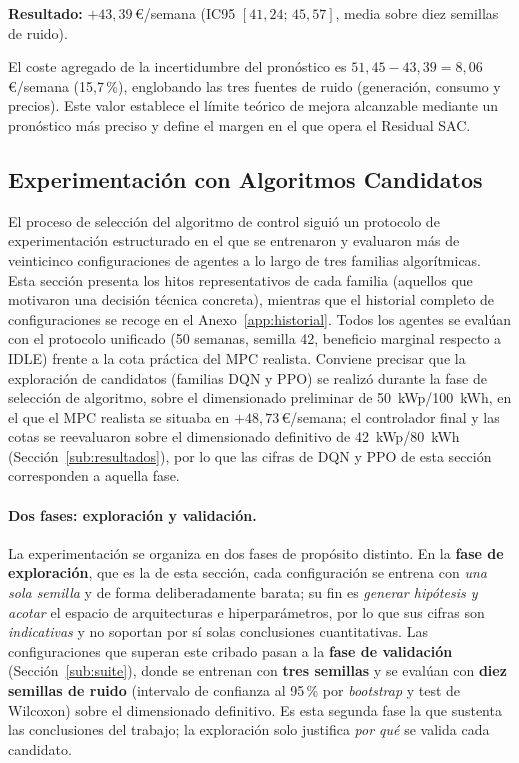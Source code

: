 \documentclass[12pt, a4paper, twoside]{report}
\begin{document}
\textbf{Resultado:} $+43{,}39$\,€/semana (IC95 $[41{,}24;\,45{,}57]$, media
sobre diez semillas de ruido).

El coste agregado de la incertidumbre del pronóstico es
$51{,}45 - 43{,}39 = 8{,}06$\,€/semana (15{,}7\,\%), englobando las tres
fuentes de ruido (generación, consumo y precios). Este valor establece el
límite teórico de mejora alcanzable mediante un pronóstico más preciso y define
el margen en el que opera el Residual SAC.

\subsection{Experimentación con Algoritmos Candidatos}
\label{sub:candidatos}

El proceso de selección del algoritmo de control siguió un protocolo de
experimentación estructurado en el que se entrenaron y evaluaron más de
veinticinco configuraciones de agentes a lo largo de tres familias
algorítmicas. Esta sección presenta los hitos representativos de cada familia
(aquellos que motivaron una decisión técnica concreta), mientras que el
historial completo de configuraciones se recoge en el
Anexo~\ref{app:historial}. Todos los agentes se evalúan con el protocolo
unificado (50 semanas, semilla 42, beneficio marginal respecto a IDLE) frente
a la cota práctica del MPC realista. Conviene precisar que la exploración de
candidatos (familias DQN y PPO) se realizó durante la fase de selección de
algoritmo, sobre el dimensionado preliminar de \SI{50}{kWp}/\SI{100}{kWh}, en el
que el MPC realista se situaba en $+48{,}73$\,€/semana; el controlador final y las
cotas se reevaluaron sobre el dimensionado definitivo de \SI{42}{kWp}/\SI{80}{kWh}
(Sección~\ref{sub:resultados}), por lo que las cifras de DQN y PPO de esta
sección corresponden a aquella fase.

\paragraph{Dos fases: exploración y validación.} La experimentación se organiza en
dos fases de propósito distinto. En la \textbf{fase de exploración}, que es la de esta
sección, cada configuración se entrena con \emph{una sola semilla} y de forma
deliberadamente barata; su fin es \emph{generar hipótesis y acotar} el espacio de
arquitecturas e hiperparámetros, por lo que sus cifras son \emph{indicativas} y no
soportan por sí solas conclusiones cuantitativas. Las configuraciones que superan
este cribado pasan a la \textbf{fase de validación} (Sección~\ref{sub:suite}), donde
se entrenan con \textbf{tres semillas} y se evalúan con \textbf{diez semillas de
ruido} (intervalo de confianza al 95\,\% por \textit{bootstrap} y test de Wilcoxon)
sobre el dimensionado definitivo. Es esta segunda fase la que sustenta las
conclusiones del trabajo; la exploración solo justifica \emph{por qué} se valida cada
candidato.
\end{document}
